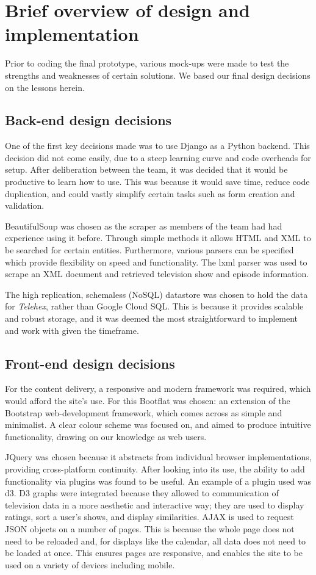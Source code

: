 \documentclass[12pt, a4paper]{article}
\begin{document}
\newpage
\section{Brief overview of design and implementation}
Prior to coding the final prototype, various mock-ups were made to test the strengths and weaknesses of certain solutions. We based our final design decisions on the lessons herein.

\subsection{Back-end design decisions}

One of the first key decisions made was to use Django as a Python backend. This decision did not come easily, due to a steep learning curve and code overheads for setup. After deliberation between the team, it was decided that it would be productive to learn how to use. This was because it would save time, reduce code duplication, and could vastly simplify certain tasks such as form creation and validation.

BeautifulSoup was chosen as the scraper as members of the team had had experience using it before. Through simple methods it allows HTML and XML to be searched for certain entities. Furthermore, various parsers can be specified which provide flexibility on speed and functionality. The lxml parser was used to scrape an XML document and retrieved television show and episode information.

The high replication, schemaless (NoSQL) datastore was chosen to hold the data for \textit{Telehex}, rather than Google Cloud SQL. This is because it provides scalable and robust storage, and it was deemed the most straightforward to implement and work with given the timeframe.


\subsection{Front-end design decisions}

For the content delivery, a responsive and modern framework was required, which would afford the site's use. For this Bootflat was chosen: an extension of the Bootstrap web-development framework, which comes across as simple and minimalist. A clear colour scheme was focused on, and aimed to produce intuitive functionality, drawing on our knowledge as web users. 

JQuery was chosen because it abstracts from individual browser implementations, providing cross-platform continuity. After looking into its use, the ability to add functionality via plugins was found to be useful. An example of a plugin used was d3. D3 graphs were integrated because they allowed to communication of television data in a more aesthetic and interactive way; they are used to display ratings, sort a user's shows, and display similarities. AJAX is used to request JSON objects on a number of pages. This is because the whole page does not need to be reloaded and, for displays like the calendar, all data does not need to be loaded at once. This ensures pages are responsive, and enables the site to be used on a variety of devices including mobile.
\end{document}
